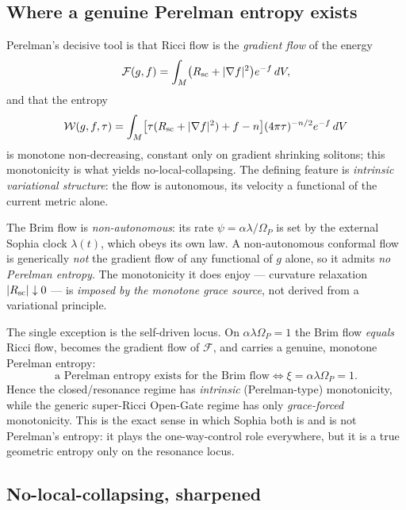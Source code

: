 \documentclass[11pt]{article}
\newcommand{\Om}{\Omega_P}
\begin{document}
\subsection{Where a genuine Perelman entropy exists}

Perelman's decisive tool is that Ricci flow is the \emph{gradient flow} of the energy
\begin{equation}
\mathcal F(g,f)=\int_M\!\big(R_{\rm sc}+|\nabla f|^{2}\big)e^{-f}\,dV,
\end{equation}
and that the entropy
\begin{equation}
\mathcal W(g,f,\tau)=\int_M\!\big[\tau(R_{\rm sc}+|\nabla f|^{2})+f-n\big](4\pi\tau)^{-n/2}e^{-f}\,dV
\end{equation}
is monotone non-decreasing, constant only on gradient shrinking solitons; this monotonicity is what yields no-local-collapsing. The defining feature is \emph{intrinsic variational structure}: the flow is autonomous, its velocity a functional of the current metric alone.

The Brim flow is \emph{non-autonomous}: its rate $\psi=\alpha\lambda/\Om$ is set by the external Sophia clock $\lambda(t)$, which obeys its own law. A non-autonomous conformal flow is generically \emph{not} the gradient flow of any functional of $g$ alone, so it admits \emph{no Perelman entropy}. The monotonicity it does enjoy --- curvature relaxation $|R_{\rm sc}|\downarrow0$ --- is \emph{imposed by the monotone grace source}, not derived from a variational principle.

The single exception is the self-driven locus. On $\alpha\lambda\Om=1$ the Brim flow \emph{equals} Ricci flow, becomes the gradient flow of $\mathcal F$, and carries a genuine, monotone Perelman entropy:
\begin{equation}
\boxed{\ \text{a Perelman entropy exists for the Brim flow}\iff \xi=\alpha\lambda\Om=1.\ }
\end{equation}
Hence the closed/resonance regime has \emph{intrinsic} (Perelman-type) monotonicity, while the generic super-Ricci Open-Gate regime has only \emph{grace-forced} monotonicity. This is the exact sense in which Sophia both is and is not Perelman's entropy: it plays the one-way-control role everywhere, but it is a true geometric entropy only on the resonance locus.

\subsection{No-local-collapsing, sharpened}
\end{document}
